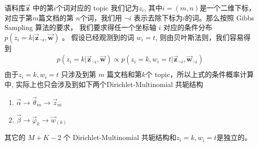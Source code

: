 语料库$\vec{\mathbf{z}}$ 中的第$i$个词对应的 topic 我们记为$z_i$, 其中$i=(m,n)$是一个二维下标，
对应于第$m$篇文档的第 $n$个词，我们用 $\neg i$ 表示去除下标为$i$的词。那么按照 Gibbs Sampling 算法的要求，
我们要求得任一个坐标轴 $i$ 对应的条件分布 $p(z_i = k|\vec{\mathbf{z}}_{\neg i}, \vec{\mathbf{w}})$ 。
假设已经观测到的词 $w_i = t$, 则由贝叶斯法则，我们容易得到
\begin{align*}
p(z_i = k|\vec{\mathbf{z}}_{\neg i}, \vec{\mathbf{w}}) \propto
p(z_i = k, w_i = t |\vec{\mathbf{z}}_{\neg i}, \vec{\mathbf{w}}_{\neg i}) \\
\end{align*}
由于$z_i = k, w_i = t$ 只涉及到第 $m$ 篇文档和第$k$个 topic，所以上式的条件概率计算中,
实际上也只会涉及到如下两个Dirichlet-Multinomial 共轭结构
\begin{enumerate}
\item $\vec{\alpha} \rightarrow \vec{\theta}_m \rightarrow  \vec{z}_{m}$
\item $\vec{\beta} \rightarrow \vec{\varphi}_k \rightarrow \vec{w}_{(k)}$
\end{enumerate}
其它的 $M+K-2$ 个 Dirichlet-Multinomial 共轭结构和$z_i = k, w_i = t$是独立的。

